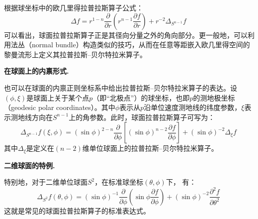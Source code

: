 根据球坐标中的欧几里得拉普拉斯算子公式：
\[
\Delta f
= r^{1-n} \frac{\partial}{\partial r}
\left( r^{n-1} \frac{\partial f}{\partial r} \right)
+ r^{-2} \Delta_{S^{n-1}} f~
\]
可以看出，球面拉普拉斯算子正是其径向分量之外的角向部分。更一般地，可以利用法丛（normal bundle）构造类似的技巧，从而在任意等距嵌入欧几里得空间的黎曼流形上定义其拉普拉斯–贝尔特拉米算子。

\textbf{在球面上的内禀形式.}

也可以在球面的内禀正则坐标系中给出拉普拉斯–贝尔特拉米算子的表达。设$(\phi, \xi)$是球面上关于某个点$p$（即“北极点”）的球坐标，也即$p$的测地极坐标（geodesic polar coordinates）。其中$\phi$表示从$p$沿单位速度测地线的纬度参数，$\xi$表示测地线方向在$S^{n-1}$上的角参数。此时，球面拉普拉斯算子可写为：
\[
\Delta_{S^{n-1}} f(\xi, \phi)
= (\sin \phi)^{2-n}
\frac{\partial}{\partial \phi}
\left[ (\sin \phi)^{n-2} \frac{\partial f}{\partial \phi} \right]
+ (\sin \phi)^{-2} \Delta_{\xi} f~
\]
其中$\Delta_{\xi}$是定义在$(n-2)$维单位球面上的拉普拉斯–贝尔特拉米算子。

\textbf{二维球面的特例.}

特别地，对于二维单位球面$S^{2}$，在标准球坐标$(\theta, \phi)$下，
有：
\[
\Delta_{S^{2}} f(\theta, \phi)
= (\sin \phi)^{-1}
\frac{\partial}{\partial \phi}
\left( \sin \phi \frac{\partial f}{\partial \phi} \right)
+ (\sin \phi)^{-2}
\frac{\partial^{2} f}{\partial \theta^{2}}~
\]
这就是常见的球面拉普拉斯算子的标准表达式。
